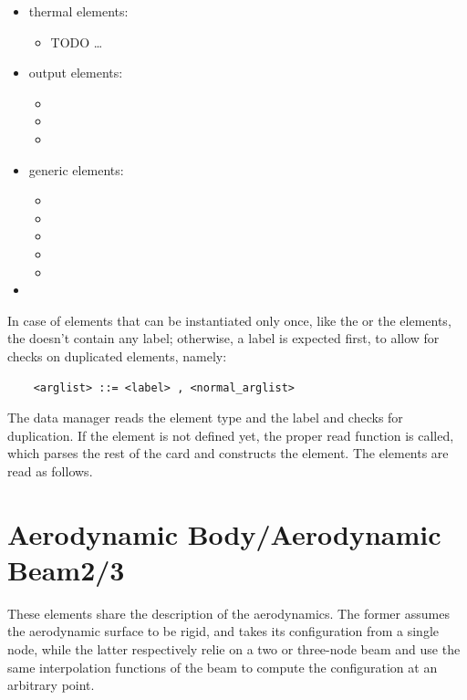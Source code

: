 \begin{itemize}
\item thermal elements:
\begin{itemize}
\item TODO \ldots
\end{itemize}

\item output elements:
\begin{itemize}
\item {}
\item {}
\item {}
\end{itemize}

\item generic elements:
\begin{itemize}
\item {}
\item {}
\item {}
\item {}
\item {}
\end{itemize}

\item {}
\end{itemize}


In case of elements that can be instantiated only once, like
the  or the  elements, the 
doesn't contain any label; otherwise, a label is expected first, to allow 
for checks on duplicated elements, namely: 
\begin{verbatim}
    <arglist> ::= <label> , <normal_arglist>
\end{verbatim}
The data manager reads the element type and the label and checks for
duplication. If the element is not defined yet, the proper read function is
called, which parses the rest of the card and constructs the element.
The elements are read as follows.



\section{Aerodynamic Body/Aerodynamic Beam2/3}
These elements share the description of the aerodynamics.
The former assumes the aerodynamic surface to be rigid,
and takes its configuration from a single node, while the latter
respectively relie on a two or three-node beam
and use the same interpolation functions of the beam to compute
the configuration at an arbitrary point.

